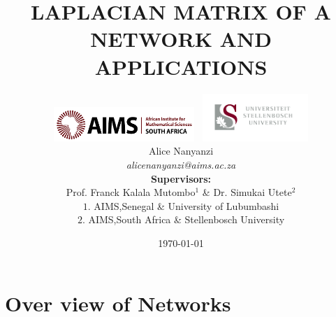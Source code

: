 \documentclass{beamer}
\title[Laplacian Matrix]{LAPLACIAN MATRIX OF A NETWORK AND APPLICATIONS} %
\author[Alice Nanyanzi] {\includegraphics[width=0.4\textwidth]{images/AIMSlogo.png}\hspace*{3.75cm}~%
	\includegraphics[width=0.3\textwidth]{images/su1.png} \\
	\vspace{0.75cm}
	Alice Nanyanzi \\
	\textit{alicenanyanzi@aims.ac.za}\\
	\vspace{0.4cm}
	\textbf{Supervisors:}\\
	 Prof. Franck Kalala Mutombo$^1$ \& Dr. Simukai Utete$^2$\\ 
	 \vspace{0.4cm}
	 $1.$ AIMS,Senegal \& University of Lubumbashi\\
	 $2.$ AIMS,South Africa \& Stellenbosch University
} %
\institute[AIMS-SU] %
{
}
\date{\today} %
\begin{document}
\begin{frame}
\titlepage %
\end{frame}

\begin{frame}
\frametitle{} %
\tableofcontents %
\end{frame}



\section{Over view of Networks} %

\end{document}
